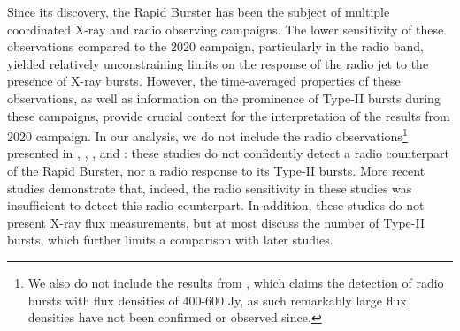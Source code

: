\documentclass[fleqn,usenatbib]{mnras}
\begin{document}
\label{sec:data_archival}

Since its discovery, the Rapid Burster has been the subject of multiple coordinated X-ray and radio observing campaigns. The lower sensitivity of these observations compared to the 2020 campaign, particularly in the radio band, yielded relatively unconstraining limits on the response of the radio jet to the presence of X-ray bursts. However, the time-averaged properties of these observations, as well as information on the prominence of Type-II bursts during these campaigns, provide crucial context for the interpretation of the results from 2020 campaign. In our analysis, we do not include the radio observations\footnote{We also do not include the results from \citet{calla1980}, which claims the detection of radio bursts with flux densities of $400$-$600$ Jy, as such remarkably large flux densities have not been confirmed or observed since.} presented in \citet{johnson1978}, \citet{rao1980}, \citet{johnston1991}, and \citet{grindlay1986}: these studies do not confidently detect a radio counterpart of the Rapid Burster, nor a radio response to its Type-II bursts. More recent studies \citep[e.g.,][]{moore2000} demonstrate that, indeed, the radio sensitivity in these studies was insufficient to detect this radio counterpart. In addition, these studies do not present X-ray flux measurements, but at most discuss the number of Type-II bursts, which further limits a comparison with later studies. 
\end{document}
